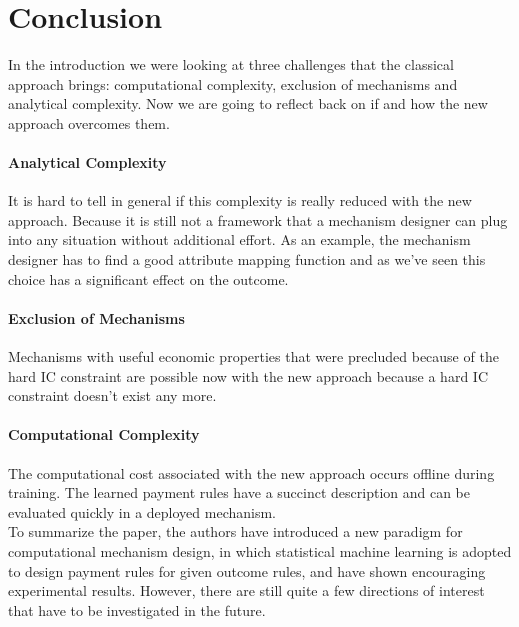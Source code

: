 \documentclass[]{article}
\begin{document}
\section{Conclusion}
In the introduction we were looking at three challenges that the classical approach brings: computational complexity, exclusion of mechanisms and analytical complexity. Now we are going to reflect back on if and how the new approach overcomes them.

\paragraph{Analytical Complexity} It is hard to tell in general if this complexity is really reduced with the new approach.
Because it is still not a framework that a mechanism designer can plug into any situation without additional effort. As an example, the mechanism designer has to find a good attribute mapping function and as we've seen this choice has a significant effect on the outcome.

\paragraph{Exclusion of Mechanisms} Mechanisms with useful economic properties that were precluded because of the hard IC constraint are possible now with the new approach because a hard IC constraint doesn't exist any more.

\paragraph{Computational Complexity} The computational cost associated with the new approach occurs offline during training. The learned payment rules have a succinct description and can be evaluated quickly in a deployed mechanism. \\


\noindent To summarize the paper, the authors have introduced a new paradigm for computational mechanism design, in which statistical machine learning is adopted to design payment rules for given outcome rules, and have shown encouraging experimental results. However, there are still quite a few directions of interest that have to be investigated in the future. 
\end{document}
